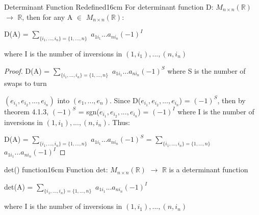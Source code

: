     \vspace{0.5cm}



    \begin{corollary}{Determinant Function Redefined}{16cm}
        For determinant function D: $M_{n \times n}(\mathbb{R})$
        $\rightarrow$ $\mathbb{R}$, then for any
        A $\in$ $M_{n \times n}(\mathbb{R})$:

        \hspace{0.5cm}
        D(A) = $\sum_{\{i_1,...,i_n\} = \{1,...,n\}}$
                $a_{1i_1}...a_{ni_n}(-1)^I$

        where I is the number of inversions
        in $(1,i_1),...,(n,i_n)$
    \end{corollary}

    \begin{proof}
        D(A) =
        $\sum_{\{i_1,...,i_n\} = \{1,...,n\}}$
            $a_{1i_1}...a_{ni_n}(-1)^S$
        where S is the number of swaps to turn 

        $(e_{i_1},e_{i_2},...,e_{i_n})$ into $(e_1,...,e_n)$.
        Since D($e_{i_1},e_{i_2},...,e_{i_n}$) = $(-1)^S$,
        then by {\color{red} theorem 4.1.3},
        $(-1)^S$ = sgn($e_{i_1},e_{i_2},...,e_{i_n}$) = $(-1)^I$
        where I is the number of inversions
        in $(1,i_1),...,(n,i_n)$. Thus:

        \hspace{0.5cm}
        D(A)
        = $\sum_{\{i_1,...,i_n\} = \{1,...,n\}}$
            $a_{1i_1}...a_{ni_n}(-1)^S$
        = $\sum_{\{i_1,...,i_n\} = \{1,...,n\}}$
            $a_{1i_1}...a_{ni_n}(-1)^I$
    \end{proof}

    \newpage



    \begin{wtheorem}{det() function}{16cm}
        Function det: $M_{n \times n}(\mathbb{R})$ $\rightarrow$ $\mathbb{R}$
        is a determinant function

        \hspace{0.5cm}
        det(A) = $\sum_{\{i_1,...,i_n\} = \{1,...,n\}}$
                    $a_{1i_1}...a_{ni_n}(-1)^I$
        
        where I is the number of inversions
        in $(1,i_1),...,(n,i_n)$
    \end{wtheorem}

